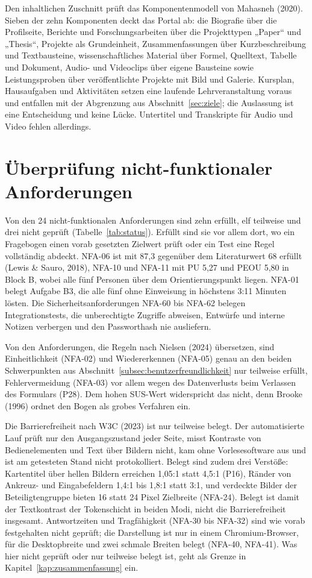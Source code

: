 Den inhaltlichen Zuschnitt prüft das Komponentenmodell von Mahasneh (2020). Sieben der zehn Komponenten deckt das Portal ab: die Biografie über die Profilseite, Berichte und Forschungsarbeiten über die Projekttypen „Paper“ und „Thesis“, Projekte als Grundeinheit, Zusammenfassungen über Kurzbeschreibung und Textbausteine, wissenschaftliches Material über Formel, Quelltext, Tabelle und Dokument, Audio- und Videoclips über eigene Bausteine sowie Leistungsproben über veröffentlichte Projekte mit Bild und Galerie. Kursplan, Hausaufgaben und Aktivitäten setzen eine laufende Lehrveranstaltung voraus und entfallen mit der Abgrenzung aus Abschnitt~\ref{sec:ziele}; die Auslassung ist eine Entscheidung und keine Lücke. Untertitel und Transkripte für Audio und Video fehlen allerdings.

\section{Überprüfung nicht-funktionaler Anforderungen}
\label{sec:pruefung-nfa}

Von den 24 nicht-funktionalen Anforderungen sind zehn erfüllt, elf teilweise und drei nicht geprüft (Tabelle~\ref{tab:status}). Erfüllt sind sie vor allem dort, wo ein Fragebogen einen vorab gesetzten Zielwert prüft oder ein Test eine Regel vollständig abdeckt. NFA-06 ist mit 87,3 gegenüber dem Literaturwert 68 erfüllt (Lewis \& Sauro, 2018), NFA-10 und NFA-11 mit PU 5,27 und PEOU 5,80 in Block B, wobei alle fünf Personen über dem Orientierungspunkt liegen. NFA-01 belegt Aufgabe B3, die alle fünf ohne Einweisung in höchstens 3:11 Minuten lösten. Die Sicherheitsanforderungen NFA-60 bis NFA-62 belegen Integrationstests, die unberechtigte Zugriffe abweisen, Entwürfe und interne Notizen verbergen und den Passworthash nie ausliefern.

Von den Anforderungen, die Regeln nach Nielsen (2024) übersetzen, sind Einheitlichkeit (NFA-02) und Wiedererkennen (NFA-05) genau an den beiden Schwerpunkten aus Abschnitt~\ref{subsec:benutzerfreundlichkeit} nur teilweise erfüllt, Fehlervermeidung (NFA-03) vor allem wegen des Datenverlusts beim Verlassen des Formulars (P28). Dem hohen SUS-Wert widerspricht das nicht, denn Brooke (1996) ordnet den Bogen als grobes Verfahren ein.

Die Barrierefreiheit nach W3C (2023) ist nur teilweise belegt. Der automatisierte Lauf prüft nur den Ausgangszustand jeder Seite, misst Kontraste von Bedienelementen und Text über Bildern nicht, kam ohne Vorlesesoftware aus und ist am getesteten Stand nicht protokolliert. Belegt sind zudem drei Verstöße: Kartentitel über hellen Bildern erreichen 1,05:1 statt 4,5:1 (P16), Ränder von Ankreuz- und Eingabefeldern 1,4:1 bis 1,8:1 statt 3:1, und verdeckte Bilder der Beteiligtengruppe bieten 16 statt 24 Pixel Zielbreite (NFA-24). Belegt ist damit der Textkontrast der Tokenschicht in beiden Modi, nicht die Barrierefreiheit insgesamt. Antwortzeiten und Tragfähigkeit (NFA-30 bis NFA-32) sind wie vorab festgehalten nicht geprüft; die Darstellung ist nur in einem Chromium-Browser, für die Desktopbreite und zwei schmale Breiten belegt (NFA-40, NFA-41). Was hier nicht geprüft oder nur teilweise belegt ist, geht als Grenze in Kapitel~\ref{kap:zusammenfassung} ein.

